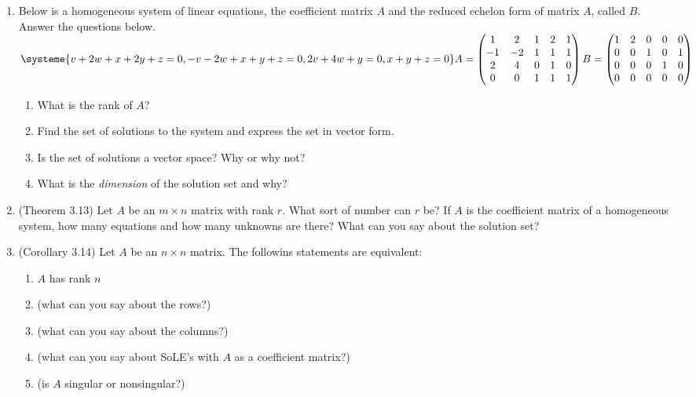 \documentclass[11pt,fleqn]{article}
\begin{document}
\renewcommand{\headrulewidth}{0pt}
\newcommand{\blank}[1]{\rule{#1}{0.75pt}}
\renewcommand{\d}{\displaystyle}

\newcommand{\bpm}{\begin{pmatrix}}
\newcommand{\epm}{\end{pmatrix}}

\vspace*{-0.7in}

\begin{center}
  \large {}
\end{center}
\begin{enumerate}
\item Below is a homogeneous system of linear equations, the coefficient matrix $A$ and the reduced echelon form of matrix $A$, called $B.$ Answer the questions below.\\

$\systeme{v+2w+x+2y+z=0, -v-2w+x+y+z=0, 2v+4w+y=0,x+y+z=0} \hfill A= \bpm 1&2&1&2&1 \\ -1&-2&1&1&1 \\ 2&4&0&1&0 \\ 0&0&1&1&1 \epm \hfill B= \bpm 1&2&0&0&0 \\ 0&0&1&0&1 \\ 0&0&0&1&0\\0&0&0&0&0 \epm $

\begin{enumerate}
\item What is the rank of $A$?\\

\item Find the set of solutions to the system and express the set in vector form.
\vfill
\item Is the set of solutions a vector space? Why or why not?
\vfill
\item What is the \emph{dimension} of the solution set and why?
\vfill
\end{enumerate}
\item (Theorem 3.13) Let $A$ be an $m \times n$ matrix with rank $r$. What sort of number can $r$ be? If $A$ is the coefficient matrix of a homogeneous system, how many equations and how many unknowns are there? What can you say about the solution set?
\vfill 
\newpage
\item (Corollary 3.14) Let $A$ be an $n \times n$ matrix. The followins statements are equivalent:
	\begin{enumerate}
	\item $A$ has rank $n$
	\item (what can you say about the rows?)\\
	\item (what can you say about the columns?)\\
	\item (what can you say about SoLE's with $A$ as a coefficient matrix?)\\
	\item (is $A$ singular or nonsingular?)\\
	\end{enumerate}
\end{enumerate}	
\end{document}
